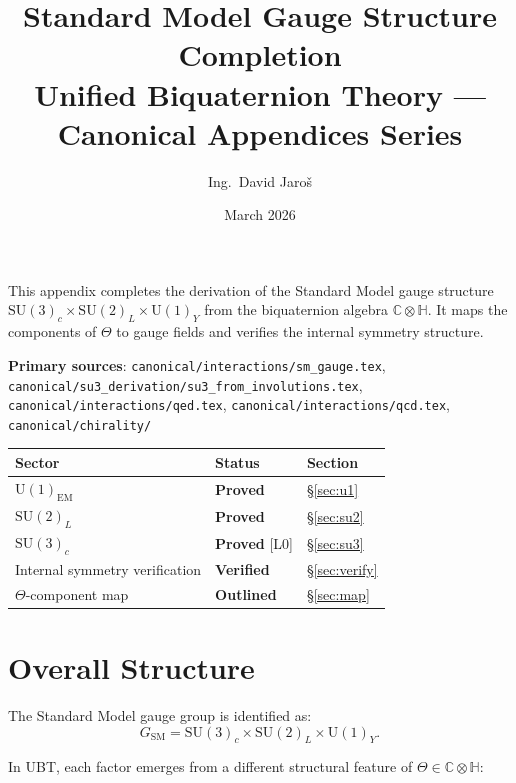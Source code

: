 \documentclass[11pt,a4paper]{article}
\title{\textbf{Standard Model Gauge Structure Completion}\\
\large Unified Biquaternion Theory — Canonical Appendices Series}
\author{Ing.\ David Jaroš}
\date{March 2026}
\theoremstyle{definition}
\theoremstyle{remark}
\begin{document}
\maketitle
\tableofcontents
\bigskip

\begin{tcolorbox}[colback=blue!4!white,colframe=blue!50!black,title=Purpose]
This appendix completes the derivation of the Standard Model gauge structure
$\mathrm{SU}(3)_c \times \mathrm{SU}(2)_L \times \mathrm{U}(1)_Y$ from
the biquaternion algebra $\mathbb{C}\otimes\mathbb{H}$.
It maps the components of $\Theta$ to gauge fields and verifies the
internal symmetry structure.

\medskip
\textbf{Primary sources}:
\texttt{canonical/interactions/sm\_gauge.tex},
\texttt{canonical/su3\_derivation/su3\_from\_involutions.tex},
\texttt{canonical/interactions/qed.tex},
\texttt{canonical/interactions/qcd.tex},
\texttt{canonical/chirality/}

\medskip
\begin{tabular}{lll}
\hline
Sector & Status & Section \\
\hline
$\mathrm{U}(1)_{\mathrm{EM}}$ & \textbf{Proved} & \S\ref{sec:u1} \\
$\mathrm{SU}(2)_L$ & \textbf{Proved} & \S\ref{sec:su2} \\
$\mathrm{SU}(3)_c$ & \textbf{Proved} [L0] & \S\ref{sec:su3} \\
Internal symmetry verification & \textbf{Verified} & \S\ref{sec:verify} \\
$\Theta$-component map & \textbf{Outlined} & \S\ref{sec:map} \\
\hline
\end{tabular}
\end{tcolorbox}

\section{Overall Structure}\label{sec:overall}

The Standard Model gauge group is identified as:
\begin{equation}\label{eq:SMgroup}
  G_{\mathrm{SM}}
  = \mathrm{SU}(3)_c \times \mathrm{SU}(2)_L \times \mathrm{U}(1)_Y.
\end{equation}

In UBT, each factor emerges from a different structural feature of
$\Theta \in \mathbb{C}\otimes\mathbb{H}$:
\end{document}
